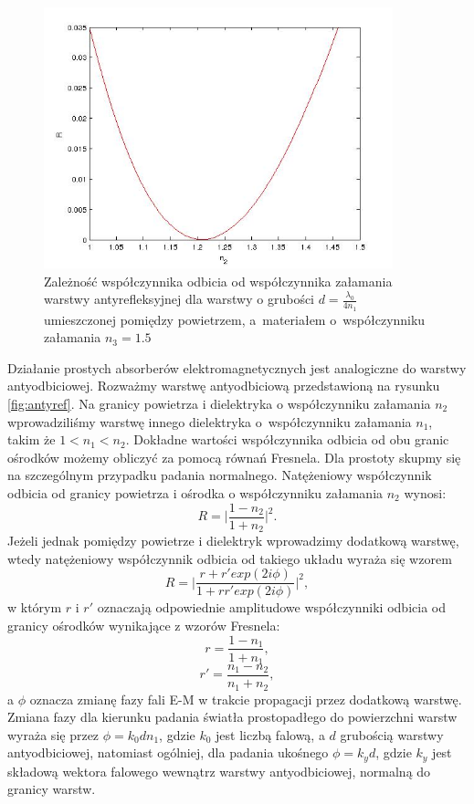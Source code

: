 \begin{figure}[tb]
	\centering
	\includegraphics[width=0.9\textwidth]{images/antyref.jpg}
	\caption{Zależność współczynnika odbicia od współczynnika załamania warstwy antyrefleksyjnej dla warstwy o grubości $d=\frac{\lambda_0}{4 n_1}$ umieszczonej pomiędzy powietrzem, a~materiałem o~współczynniku załamania $n_3=1.5$}
	\label{fig:antyref-result}
\end{figure}


Działanie prostych absorberów elektromagnetycznych jest analogiczne do warstwy antyodbiciowej. Rozważmy   warstwę antyodbiciową przedstawioną na rysunku \ref{fig:antyref}. Na granicy powietrza i dielektryka o współczynniku załamania $n_2$ wprowadziliśmy warstwę innego dielektryka o~współczynniku załamania $n_1$, takim że $1<n_1<n_2$. Dokładne wartości współczynnika odbicia od obu granic ośrodków możemy obliczyć za pomocą równań Fresnela. Dla prostoty skupmy się na szczególnym przypadku padania normalnego. Natężeniowy współczynnik odbicia od granicy powietrza i ośrodka o współczynniku załamania $n_2$ wynosi:
\begin{equation}
R=\bigg|\frac{1-n_2}{1+n_2}\bigg|^2.
\end{equation}
Jeżeli jednak pomiędzy powietrze i dielektryk wprowadzimy dodatkową warstwę, wtedy natężeniowy współczynnik odbicia od takiego układu wyraża się wzorem
\begin{equation}
R=\Bigg| \frac{r+r' exp(2 i\phi)}{1+r r' exp(2 i\phi)} \Bigg|^2,
\end{equation}
w którym $r$ i $r'$ oznaczają odpowiednie amplitudowe współczynniki odbicia od granicy ośrodków wynikające z wzorów Fresnela:
\begin{equation}
r=\frac{1-n_1}{1+n_1},
\end{equation}
\begin{equation}
r'=\frac{n_1-n_2}{n_1+n_2},
\end{equation}
a $\phi$ oznacza zmianę fazy fali E-M w trakcie propagacji przez dodatkową warstwę. Zmiana fazy dla kierunku padania światła prostopadłego do powierzchni warstw wyraża się przez $\phi=k_0 d n_1$, gdzie $k_0$ jest liczbą falową, a $d$ grubością warstwy antyodbiciowej, natomiast ogólniej, dla padania ukośnego $\phi=k_y d$, gdzie $k_y$ jest składową wektora falowego wewnątrz warstwy antyodbiciowej, normalną do granicy warstw. 

